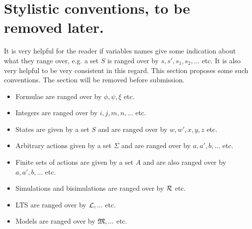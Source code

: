 \section{Stylistic conventions, to be removed later.}

It is very helpful for the reader if variables names give some
indication about what they range over, e.g. a set $S$ is ranged over
by $s, s', s_1, s_2, ...$ etc.  It is also very helpful to be very
consistent in this regard.  This section proposes some such
conventions. The section will be removed before submission.

\begin{itemize}

\item Formulae  are ranged over by $\phi, \psi, \xi$ etc.
\item Integers are ranged over by $i, j, m, n, ...$ etc.
\item States are given by a set $S$ and  are ranged over by $w, w', x, y, z$ etc.
\item Arbitrary actions given by a set $\Sigma$ and are ranged over by $a, a', b, ...$ etc.
\item Finite sets of actions are given by a set $A$ and are also ranged over by $a, a', b, ...$ etc.
\item Simulations and bisimulations are ranged over by $\mathcal{R}$ etc.
\item LTS are ranged over by $\mathcal{L}, ...$ etc.
\item Models are ranged over by $\mathfrak{M}, ...$ etc.

\end{itemize}
